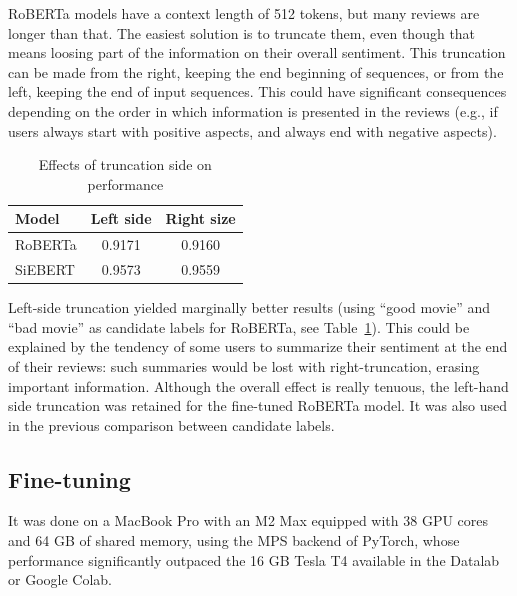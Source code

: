 \documentclass{article}
\begin{document}
RoBERTa models have a context length of 512 tokens, but many reviews are longer than that. The easiest solution is to truncate them, even though that means loosing part of the information on their overall sentiment. This truncation can be made from the right, keeping the end beginning of sequences, or from the left, keeping the end of input sequences. This could have significant consequences depending on the order in which information is presented in the reviews (e.g., if users always start with positive aspects, and always end with negative aspects).

\begin{table}
  \centering
  \begin{tabular}{lcc}
    \toprule
    \textbf{Model} & \textbf{Left side} & \textbf{Right size} \\
    \midrule
    RoBERTa & 0.9171 & 0.9160 \\
    SiEBERT & 0.9573 & 0.9559 \\
    \bottomrule
  \end{tabular}
  \vspace{0.5em}
  \caption{Effects of truncation side on performance}
  \label{tab:truncation}
\end{table}

Left-side truncation yielded marginally better results (using \enquote{good movie} and \enquote{bad movie} as candidate labels for RoBERTa, see Table~\ref{tab:truncation}). This could be explained by the tendency of some users to summarize their sentiment at the end of their reviews: such summaries would be lost with right-truncation, erasing important information. Although the overall effect is really tenuous, the left-hand side truncation was retained for the fine-tuned RoBERTa model. It was also used in the previous comparison between candidate labels.

\subsection{Fine-tuning}

It was done on a MacBook Pro with an M2 Max equipped with 38 GPU cores and 64 GB of shared memory, using the MPS backend of PyTorch, whose performance significantly outpaced the 16 GB Tesla T4 available in the Datalab or Google Colab.
\end{document}
